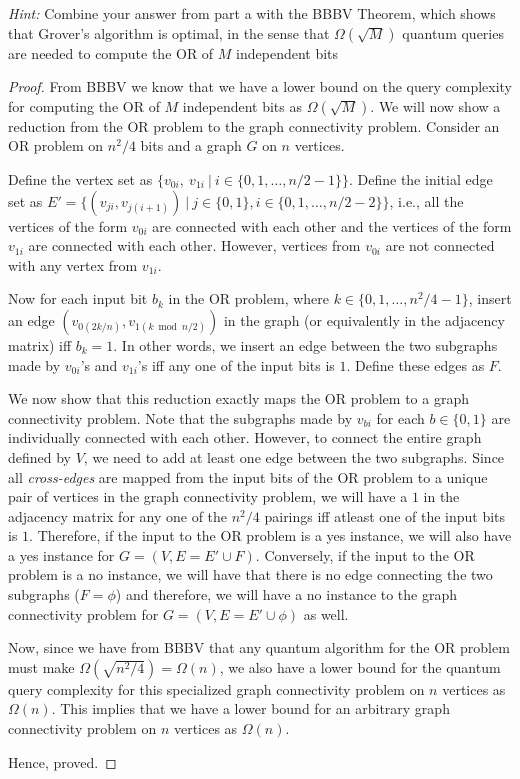 \begin{solution}[label=ques:4c]
\begin{question}
\textit{Hint:} Combine your answer from part a with the BBBV Theorem, which shows that Grover's algorithm is optimal, in the sense that $\Omega(\sqrt{M})$ quantum queries are needed to compute the OR of $M$ independent bits
  \end{question}
  \tcblower{}
  \begin{proof}[Proof]
    From BBBV we know that we have a lower bound on the query complexity for computing the OR of $M$ independent bits as $\Omega(\sqrt{M})$. We will now show a reduction from the OR problem to the graph connectivity problem. Consider an OR problem on $n^2/4$ bits and a graph $G$ on $n$ vertices.\par
    Define the vertex set as $\{v_{0i},\ v_{1i}\ |\ i\in \{0, 1, \ldots, n/2 - 1\}\}$. Define the initial edge set as $E' = \{(v_{ji}, v_{j(i + 1)})\ |\ j\in \{0, 1\}, i\in \{0, 1, \ldots, n/2 - 2\}\}$, i.e., all the vertices of the form $v_{0i}$ are connected with each other and the vertices of the form $v_{1i}$ are connected with each other. However, vertices from $v_{0i}$ are not connected with any vertex from $v_{1i}$.\par
    Now for each input bit $b_k$ in the OR problem, where $k\in\{0, 1, \ldots, n^2/4 - 1\}$, insert an edge $(v_{0(2k/n)}, v_{1(k\bmod n/2)})$ in the graph (or equivalently in the adjacency matrix) iff $b_k = 1$. In other words, we insert an edge between the two subgraphs made by $v_{0i}$'s and $v_{1i}$'s iff any one of the input bits is $1$. Define these edges as $F$.\par
    We now show that this reduction exactly maps the OR problem to a graph connectivity problem. Note that the subgraphs made by $v_{bi}$ for each $b\in\{0, 1\}$ are individually connected with each other. However, to connect the entire graph defined by $V$, we need to add at least one edge between the two subgraphs. Since all \textit{cross-edges} are mapped from the input bits of the OR problem to a unique pair of vertices in the graph connectivity problem, we will have a $1$ in the adjacency matrix for any one of the $n^2/4$ pairings iff atleast one of the input bits is $1$. Therefore, if the input to the OR problem is a yes instance, we will also have a yes instance for $G = \left(V, E = E'\cup F\right)$. Conversely, if the input to the OR problem is a no instance, we will have that there is no edge connecting the two subgraphs ($F = \phi$) and therefore, we will have a no instance to the graph connectivity problem for $G = \left(V, E = E'\cup \phi\right)$ as well.\par
    Now, since we have from BBBV that any quantum algorithm for the OR problem must make $\Omega(\sqrt{n^2/4}) = \Omega(n)$, we also have a lower bound for the quantum query complexity for this specialized graph connectivity problem on $n$ vertices as $\Omega(n)$. This implies that we have a lower bound for an arbitrary graph connectivity problem on $n$ vertices as $\Omega(n)$.\par
    Hence, proved.
  \end{proof}
\end{solution}
